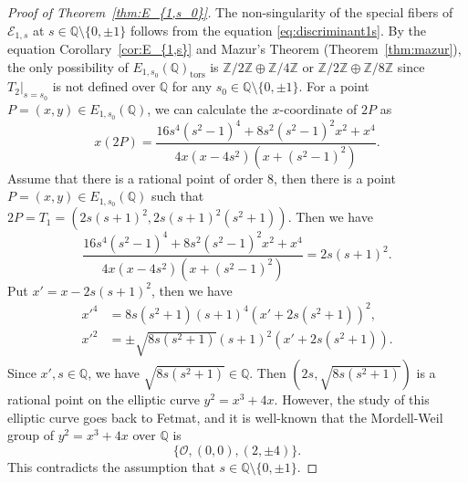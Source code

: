 \documentclass[main]{subfiles}
\begin{document}
\begin{proof}[Proof of Theorem~{\ref{thm:E_{1,s_0}}}]
    The non-singularity of the special fibers of $\mathcal{E}_{1,s}$ at $s \in \mathbb{Q} \setminus \{0,\pm 1 \}$ follows from the equation \eqref{eq:discriminant1s}.
    By the equation Corollary~\ref{cor:E_{1,s}} and Mazur's Theorem (Theorem~\ref{thm:mazur}), the only possibility of $E_{1,s_0}(\mathbb{Q})_{\text{tors}}$ is $\mathbb{Z} / 2 \mathbb{Z} \oplus \mathbb{Z} / 4 \mathbb{Z}$ or $\mathbb{Z} / 2 \mathbb{Z} \oplus \mathbb{Z} / 8 \mathbb{Z}$ since $T_2\vert_{s=s_0}$ is not defined over $\mathbb{Q}$ for any $s_0 \in \mathbb{Q} \setminus \{0,\pm 1 \}$.
    For a point $P=(x,y) \in E_{1,s_0}(\mathbb{Q})$, we can calculate the $x$-coordinate of $2P$ as
    \begin{equation*}
        x(2P) = \frac{16s^{4}(s^{2} - 1)^{4} + 8 s^{2}(s^{2} - 1)^{2} x^{2} + x^{4}}{4 x (x - 4s^{2}) (x + (s^{2} - 1)^{2})}.
    \end{equation*}
    Assume that there is a rational point of order $8$, then there is a point $P=(x,y) \in E_{1,s_0}(\mathbb{Q})$ such that $2P = T_1 = (2s(s+1)^2, 2s(s+1)^2(s^2+1))$.
    Then we have
    \begin{equation*}
        \frac{16s^{4}(s^{2} - 1)^{4} + 8 s^{2}(s^{2} - 1)^{2} x^{2} + x^{4}}{4 x (x - 4s^{2}) (x + (s^{2} - 1)^{2})} = 2s(s + 1)^{2}.
    \end{equation*}
    Put $x' = x - 2s(s+1)^2$, then we have
    \begin{align*}
        x'^4 & = 8s(s^{2} + 1)(s + 1)^{4}(x' + 2s(s^2+1))^{2},        \\
        x'^2 & = \pm \sqrt{8 s (s^2 + 1)} (s+1)^{2} (x' + 2s(s^2+1)).
    \end{align*}
    Since $x', s \in \mathbb{Q}$, we have $\sqrt{8 s (s^2 + 1)} \in \mathbb{Q}$.
    Then $(2s, \sqrt{8 s (s^2 + 1)})$ is a rational point on the elliptic curve $y^2 = x^3 + 4x$.
    However, the study of this elliptic curve goes back to Fetmat, and it is well-known that the Mordell-Weil group of $y^2 = x^3 + 4x$ over $\mathbb{Q}$ is
    \begin{equation*}
        \{\mathcal{O}, (0,0), (2,\pm 4) \}.
    \end{equation*}
    This contradicts the assumption that $s \in \mathbb{Q} \setminus \{0,\pm 1 \}$.
\end{proof}
\end{document}
